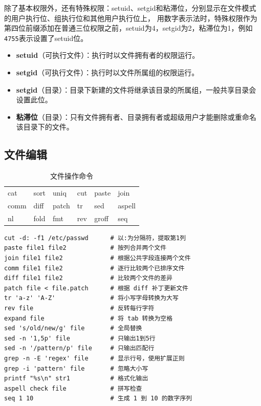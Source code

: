 除了基本权限外，还有特殊权限：setuid、setgid和粘滞位，分别显示在文件模式的用户执行位、组执行位和其他用户执行位上，
用数字表示法时，特殊权限作为第四位前缀添加在普通三位权限之前，setuid为4，setgid为2，粘滞位为1，例如\texttt{4755}表示设置了setuid位。

\begin{itemize}
	\item \textbf{setuid}（可执行文件）：执行时以文件拥有者的权限运行。
	\item \textbf{setgid}（可执行文件）：执行时以文件所属组的权限运行。
	\item \textbf{setgid}（目录）：目录下新建的文件将继承该目录的所属组，一般共享目录会设置此位。
	\item \textbf{粘滞位}（目录）：只有文件拥有者、目录拥有者或超级用户才能删除或重命名该目录下的文件。
\end{itemize}

\subsection{文件编辑}
\begin{table}[H]
	\centering
	\begin{tabular}{llllll}
		cat  & sort & uniq  & cut & paste & join   \\
		comm & diff & patch & tr  & sed   & aspell \\
		nl   & fold & fmt   & rev & groff & seq    \\
	\end{tabular}
	\caption{文件操作命令}
\end{table}

\begin{code}[title=文件编辑常用命令]
	\begin{verbatim}
cut -d: -f1 /etc/passwd      # 以:为分隔符，提取第1列
paste file1 file2            # 按列合并两个文件
join file1 file2             # 根据公共字段连接两个文件
comm file1 file2             # 逐行比较两个已排序文件
diff file1 file2             # 比较两个文件的差异
patch file < file.patch      # 根据 diff 补丁更新文件
tr 'a-z' 'A-Z'               # 将小写字母转换为大写
rev file                     # 反转每行字符
expand file                  # 将 tab 转换为空格
sed 's/old/new/g' file       # 全局替换
sed -n '1,5p' file           # 只输出1到5行
sed -n '/pattern/p' file     # 只输出匹配行
grep -n -E 'regex' file      # 显示行号，使用扩展正则
grep -i 'pattern' file       # 忽略大小写
printf "%s\n" str1           # 格式化输出
aspell check file            # 拼写检查
seq 1 10                     # 生成 1 到 10 的数字序列
	\end{verbatim}
\end{code}

